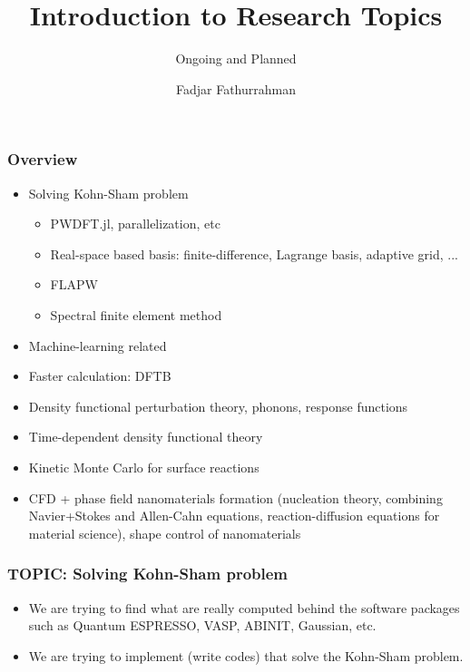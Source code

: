 \documentclass[english,9pt]{beamer}
\begin{document}
\title{Introduction to Research Topics}
\subtitle{Ongoing and Planned}
\author{Fadjar Fathurrahman}
\date{}


\frame{\titlepage}


\begin{frame}
\frametitle{Overview}

\begin{itemize}
\item Solving Kohn-Sham problem
  \begin{itemize}
  \item PWDFT.jl, parallelization, etc
  \item Real-space based basis: finite-difference, Lagrange basis, adaptive grid, ...
  \item FLAPW
  \item Spectral finite element method
  \end{itemize}
\item Machine-learning related
\item Faster calculation: DFTB
\item Density functional perturbation theory, phonons, response functions
\item Time-dependent density functional theory
\item Kinetic Monte Carlo for surface reactions
\item CFD + phase field nanomaterials formation (nucleation theory, combining Navier+Stokes and Allen-Cahn equations, reaction-diffusion equations for material science), shape control of nanomaterials
\end{itemize}

\end{frame}


\begin{frame}
\frametitle{TOPIC: Solving Kohn-Sham problem}

\begin{itemize}
\item We are trying to find what are really computed behind the software packages such
 as Quantum ESPRESSO, VASP, ABINIT, Gaussian, etc.
\item We are trying to implement (write codes) that solve the Kohn-Sham problem.
\end{itemize}

\end{frame}
\end{document}

